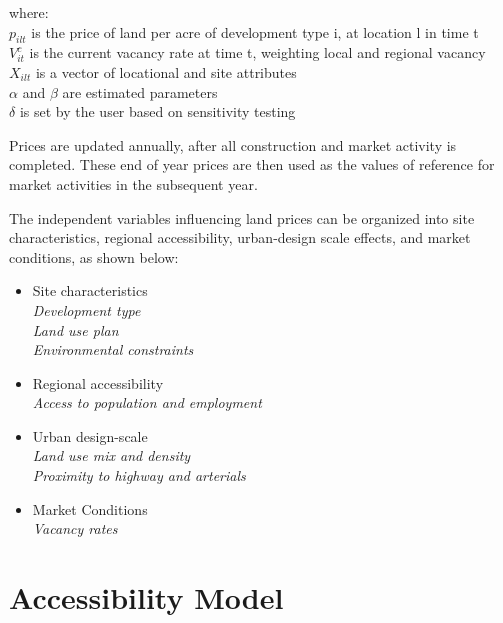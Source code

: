 \begin{tabbing}
where: \= \\
    \> $p_{ilt}$ is the price of land per acre of development type i, at location l in time
    t \\
    \> $V^c_{it}$ is the current vacancy rate at time t, weighting local and regional
    vacancy \\
    \> $X_{ilt}$ is a vector of locational and site attributes \\
    \> $\alpha$ and $\beta$ are estimated parameters \\
    \> $\delta$ is set by the user based on sensitivity testing
\end{tabbing}

Prices are updated annually, after all construction and market
activity is completed.  These end of year prices are then used as
the values of reference for market activities in the subsequent
year.

The independent variables influencing land prices can be organized
into site characteristics, regional accessibility, urban-design
scale effects, and market conditions, as shown below:

\begin{itemize}

\item Site characteristics \\
\emph{Development type \\
Land use plan \\
Environmental constraints}

\item Regional accessibility \\
\emph{Access to population and employment}

\item Urban design-scale \\
\emph{Land use mix and density \\
Proximity to highway and arterials}

\item Market Conditions \\
\emph{Vacancy rates}

\end{itemize}

\section{Accessibility Model}

